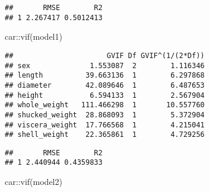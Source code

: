 \documentclass[
]{article}
\newenvironment{Shaded}{\begin{snugshade}}{\end{snugshade}}
\newcommand{\AttributeTok}[1]{\textcolor[rgb]{0.77,0.63,0.00}{#1}}
\newcommand{\CommentTok}[1]{\textcolor[rgb]{0.56,0.35,0.01}{\textit{#1}}}
\newcommand{\FunctionTok}[1]{\textcolor[rgb]{0.00,0.00,0.00}{#1}}
\newcommand{\NormalTok}[1]{#1}
\newcommand{\OtherTok}[1]{\textcolor[rgb]{0.56,0.35,0.01}{#1}}
\newcommand{\SpecialCharTok}[1]{\textcolor[rgb]{0.00,0.00,0.00}{#1}}
\begin{document}
\begin{verbatim}
##       RMSE        R2
## 1 2.267417 0.5012413
\end{verbatim}

\begin{Shaded}
\begin{Highlighting}[]
\NormalTok{car}\SpecialCharTok{::}\FunctionTok{vif}\NormalTok{(model1)}
\end{Highlighting}
\end{Shaded}

\begin{verbatim}
##                      GVIF Df GVIF^(1/(2*Df))
## sex              1.553087  2        1.116346
## length          39.663136  1        6.297868
## diameter        42.089646  1        6.487653
## height           6.594133  1        2.567904
## whole_weight   111.466298  1       10.557760
## shucked_weight  28.868093  1        5.372904
## viscera_weight  17.766568  1        4.215041
## shell_weight    22.365861  1        4.729256
\end{verbatim}

\begin{Shaded}
\end{Shaded}

\begin{verbatim}
##       RMSE        R2
## 1 2.440944 0.4359833
\end{verbatim}

\begin{Shaded}
\begin{Highlighting}[]
\NormalTok{car}\SpecialCharTok{::}\FunctionTok{vif}\NormalTok{(model2)}
\end{Highlighting}
\end{Shaded}
\end{document}
